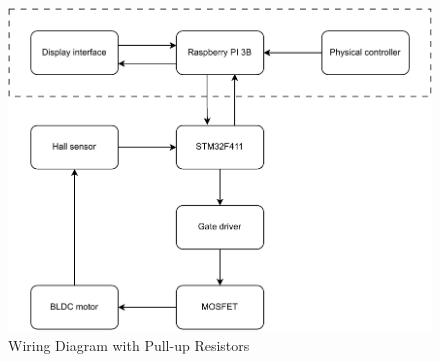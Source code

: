 \begin{figure}[H]
    \centering
    \includegraphics[width=1\textwidth]{img/DrawIO/Componentdiagram UI.pdf}
    \caption{Wiring Diagram with Pull-up Resistors}
    \label{fig:hall_sensor_wiring_diagram}
\end{figure}
